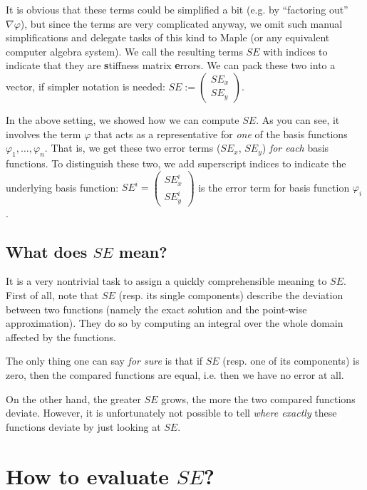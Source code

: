 \documentclass{article}
\renewcommand{\phi}{\varphi}
\begin{document}
It is obvious that these terms could be simplified a bit (e.g. by ``factoring out'' $\nabla \phi$), but since the terms are very complicated anyway, we omit such manual simplifications and delegate tasks of this kind to Maple (or any equivalent computer algebra system). We call the resulting terms $SE$ with indices to indicate that they are \textbf{s}tiffness matrix \textbf{e}rrors. We can pack these two into a vector, if simpler notation is needed: $SE :=
\begin{pmatrix}
  SE_x \\ SE_y
\end{pmatrix}$.

In the above setting, we showed how we can compute $SE$. As you can see, it involves the term $\phi$ that acts as a representative for \emph{one} of the basis functions $\phi_1,\dots,\phi_n$. That is, we get these two error terms ($SE_x$, $SE_y$) \emph{for each} basis functions. To distinguish these two, we add superscript indices to indicate the underlying basis function: $SE^i=
\begin{pmatrix}
  SE_x^i \\ SE_y^i
\end{pmatrix}$ is the error term for basis function $\phi_i$.

\subsection{What does $SE$ mean?}
\label{sec:stiffness-analysis-what-does-se-mean}

It is a very nontrivial task to assign a quickly comprehensible meaning to $SE$. First of all, note that $SE$ (resp. its single components) describe the deviation between two functions (namely the exact solution and the point-wise approximation). They do so by computing an integral over the whole domain affected by the functions.

The only thing one can say \emph{for sure} is that if $SE$ (resp. one of its components) is zero, then the compared functions are equal, i.e. then we have no error at all.

On the other hand, the greater $SE$ grows, the more the two compared functions deviate. However, it is unfortunately not possible to tell \emph{where exactly} these functions deviate by just looking at $SE$.

\section{How to evaluate $SE$?}
\label{sec:how-to-evaluate-e}
\end{document}
